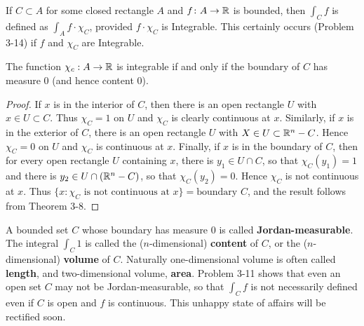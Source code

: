 If $C\subset A$ for some closed rectangle $A$ and $f\colon{}A\to \mathbb{R}$ is bounded, then 
$\int_{C }^{}{f}$ is defined as $\int_A f\cdot \chi_C$, provided $f\cdot \chi_C$ is 
Integrable. This certainly occurs (Problem 3-14) if $f$ and $\chi_C$ are Integrable.

\begin{theorem}
    The function $\chi_c: A\to \mathbb{R}$ is integrable if and
    only if the boundary of $C$ has measure 0 (and hence content 0).
\end{theorem}

\begin{proof}
    If $x$ is in the interior of $C$, then there is an open
    rectangle $U$ with $x \in U \subset C$. Thus $\chi_C = 1$ on $U$ and $\chi_C$ is
    clearly continuous at $x$. Similarly, if $x$ is in the exterior of $C$,
    there is an open rectangle $U$ with $X \in U \subset \mathbb{R}^n - C$. Hence
    $\chi_C = 0$ on $U$ and $\chi_C$ is continuous at $x$.
    Finally, if $x$ is in the boundary of $C$, then for every open rectangle $U$ containing
    $x$, there is $y_1 \in U \cap C$, so that $\chi_C(y_1) = 1$ and there is
    $y_2 \in U \cap (\mathbb{R}^n - C)$, so that $\chi_C(y_2) = 0$.
    Hence $\chi_C$ is not continuous at $x$. Thus $\{x: \chi_C \text{ is not continuous at } x\}
    =\text{boundary } C$, and the result follows from Theorem 3-8.
\end{proof}

A bounded set $C$ whose boundary has measure 0 is called
\textbf{Jordan-measurable}. The integral $\int_C1$ is called the ($n$-dimensional) 
\textbf{content} of $C$, or the ($n$-dimensional) \textbf{volume} of $C$.
Naturally one-dimensional volume is often called \textbf{length}, and two-dimensional 
volume, \textbf{area}. Problem 3-11 shows that even an open set $C$ may not be
Jordan-measurable, so that $\int_Cf$ is not necessarily defined even if $C$ is open 
and $f$ is continuous. This unhappy state of affairs will be rectified soon.


